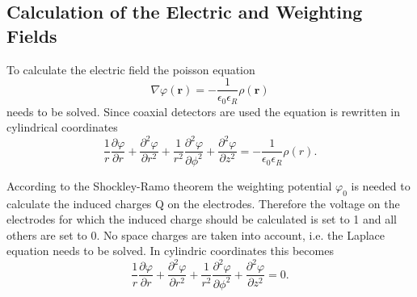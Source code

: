 \subsection{Calculation of the Electric and Weighting Fields} 
\label{sec:field}
To calculate the electric field the poisson equation 
\begin{equation}
\nabla \varphi(\textbf{r}) = -\frac{1}{\epsilon_{0} \epsilon_{R}} \rho(\textbf{r})
\label{eq:poisson}
\end{equation} 
needs to be solved. Since coaxial detectors are used
the equation is rewritten in cylindrical coordinates 
\begin{equation}
\frac{1}{r} \frac{\partial \varphi}{\partial r} + \frac{\partial^{2} \varphi}{\partial r^{2}} + \frac{1}{r^{2}} \frac{\partial^{2} \varphi}{\partial \phi^{2}} +
\frac{\partial^{2} \varphi}{\partial z^{2}} = - \frac{1}{\epsilon_{0}
\epsilon_{R}} \rho(r).
\label{eq:poisson_cyl}
\end{equation}

According to the Shockley-Ramo theorem the weighting potential
$\varphi_{0}$ is needed to calculate the induced charges Q on the
electrodes. Therefore the voltage on the electrodes for which the
induced charge should be calculated is set to 1 and all others are set
to 0. No space charges are taken into account, i.e. the Laplace equation
needs to be solved. In cylindric coordinates this becomes 
\begin{equation}
\frac{1}{r}
\frac{\partial \varphi}{\partial r} + \frac{\partial^{2} \varphi}{\partial
r^{2}} + \frac{1}{r^{2}} \frac{\partial^{2} \varphi}{\partial \phi^{2}} +
\frac{\partial^{2} \varphi}{\partial z^{2}} = 0.
\label{eq:laplace}
\end{equation}

